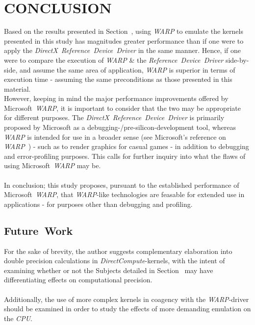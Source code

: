 
\section{CONCLUSION}
\label{sec:conclusion}
Based on the results presented in Section~, using \textit{WARP} to emulate the kernels presented in this study has magnitudes greater performance than if one were to apply the \textit{DirectX}~\textit{Reference~Device~Driver} in the same manner.
Hence, if one were to compare the execution of \textit{WARP} \& the \textit{Reference~Device~Driver} side-by-side, and assume the same area of application, \textit{WARP} is superior in terms of execution time - assuming the same preconditions as those presented in this material.\\
However, keeping in mind the major performance improvements offered by Microsoft~\textit{WARP}, it is important to consider that the two may be appropriate for different purposes.
The \textit{DirectX}~\textit{Reference~Device~Driver} is primarily proposed by Microsoft as a debugging-/pre-silicon-development tool, whereas \textit{WARP} is intended for use in a broader sense (see Microsoft's reference on \textit{WARP}~) - such as to render graphics for casual games - in addition to debugging and error-profiling purposes.
This calls for further inquiry into what the flaws of using Microsoft~\textit{WARP} may be.\\
\\
In conclusion; this study proposes, pursuant to the established performance of Microsoft~\textit{WARP}, that \textit{WARP}-like technologies are feasable for extended use in applications - for purposes other than debugging and profiling.

\subsection{Future~Work}
\label{sec:conclusion:futurework}
For the sake of brevity, the author suggests complementary elaboration into double precision calculations in \textit{DirectCompute}-kernels, with the intent of examining whether or not the Subjects detailed in Section~ may have differentiating effects on computational precision.\\
\\
Additionally, the use of more complex kernels in coagency with the \textit{WARP}-driver should be examined in order to study the effects of more demanding emulation on the \textit{CPU}.
